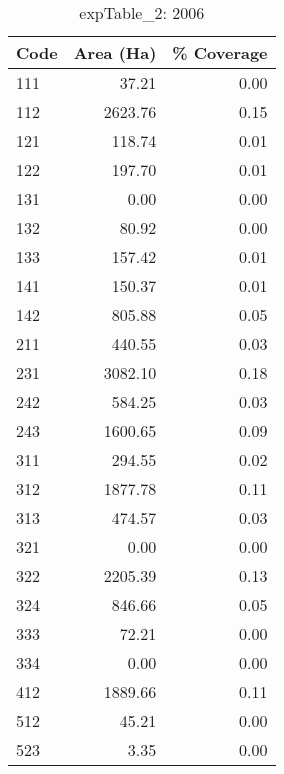 \begin{table}[ht]
\centering
\begin{tabular}{lrr}
  \hline
Code & Area (Ha) & \% Coverage \\ 
  \hline
111 & 37.21 & 0.00 \\ 
  112 & 2623.76 & 0.15 \\ 
  121 & 118.74 & 0.01 \\ 
  122 & 197.70 & 0.01 \\ 
  131 & 0.00 & 0.00 \\ 
  132 & 80.92 & 0.00 \\ 
  133 & 157.42 & 0.01 \\ 
  141 & 150.37 & 0.01 \\ 
  142 & 805.88 & 0.05 \\ 
  211 & 440.55 & 0.03 \\ 
  231 & 3082.10 & 0.18 \\ 
  242 & 584.25 & 0.03 \\ 
  243 & 1600.65 & 0.09 \\ 
  311 & 294.55 & 0.02 \\ 
  312 & 1877.78 & 0.11 \\ 
  313 & 474.57 & 0.03 \\ 
  321 & 0.00 & 0.00 \\ 
  322 & 2205.39 & 0.13 \\ 
  324 & 846.66 & 0.05 \\ 
  333 & 72.21 & 0.00 \\ 
  334 & 0.00 & 0.00 \\ 
  412 & 1889.66 & 0.11 \\ 
  512 & 45.21 & 0.00 \\ 
  523 & 3.35 & 0.00 \\ 
   \hline
\end{tabular}
\caption{expTable\_2: 2006} 
\end{table}
